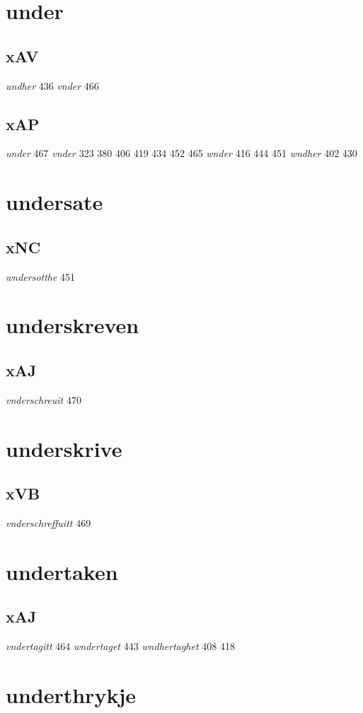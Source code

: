 \documentclass[a4paper,twocolumn]{article}
\begin{document}
\section{under}
\label{sec:orgcfcfb11}
\subsection{xAV}
\label{sec:orgbd49ef0}
\emph{undher} 436 \emph{vnder} 466 
\subsection{xAP}
\label{sec:org413620b}
\emph{under} 467 \emph{vnder} 323 380 406 419 434 452 465 \emph{wnder} 416 444 451 \emph{wndher} 402 430 
\section{undersate}
\label{sec:org9f74d48}
\subsection{xNC}
\label{sec:org844fcd6}
\emph{wndersotthe} 451 
\section{underskreven}
\label{sec:org1412ec1}
\subsection{xAJ}
\label{sec:org0b2ee09}
\emph{vnderschreuit} 470 
\section{underskrive}
\label{sec:org08e262e}
\subsection{xVB}
\label{sec:org9cbd134}
\emph{vnderschreffuitt} 469 
\section{undertaken}
\label{sec:orga26da7a}
\subsection{xAJ}
\label{sec:org4ab083c}
\emph{vndertagitt} 464 \emph{wndertaget} 443 \emph{wndhertaghet} 408 418 
\section{underthrykje}
\label{sec:orgdca5a28}
\end{document}
